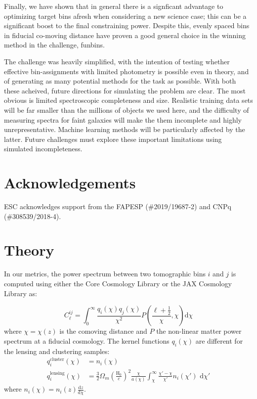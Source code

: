 \documentclass[twocolumn,twocolappendix]{aastex63}
\begin{document}
Finally, we have shown that in general there is a signficant advantage to optimizing
target bins afresh when considering a new science case; this can be a significant boost
to the final constraining power.
Despite this, evenly spaced bins in fiducial co-moving distance have proven
a good general choice in the winning method in the challenge, {\sc funbins}.

The challenge was heavily simplified, with the intention of testing whether
effective bin-assignments with limited photometry is possible even in theory,
and of generating as many potential methods for the task as possible.  With
both these acheived, future directions for simulating the problem are clear.
The most obvious is limited spectroscopic completeness and size.  Realistic
training data sets will be far smaller than the millions of objects we used here,
and the difficulty of measuring spectra for faint galaxies will make the them
incomplete and highly unrepresentative. Machine learning methods will be particularly
affected by the latter.  Future challenges must explore these important limitations
using simulated incompleteness.


\section{Acknowledgements}
ESC acknowledges support from the FAPESP (\#2019/19687-2) and CNPq  (\#308539/2018-4).




\appendix

\section{Theory}\label{app:theory}

In our metrics, the power spectrum between two tomographic bins $i$ and $j$ is
computed using either the Core Cosmology Library \citep{ccl} or the JAX
Cosmology Library \citep{jax-cosmo} as:

\begin{equation}
    C^{ij}_\ell = \int_0^{\infty} \frac{q_i(\chi) q_j(\chi)}{\chi^2} P\left(\frac{\ell +\frac{1}{2}}{\chi}, \chi \right) \mathrm{d}\chi
\end{equation}
where $\chi = \chi(z)$ is the comoving distance and $P$ the non-linear matter power spectrum at
a fiducial cosmology.  The kernel functions $q_i(\chi)$ are different for the lensing and clustering samples:
\begin{align}
    q^{\mathrm{cluster}}_i(\chi) &= n_i(\chi)\\
    q^{\mathrm{lensing}}_i(\chi) &= \frac{3}{2}\Omega_m \left(\frac{\mathrm{H}_0}{c}\right)^2 \frac{\chi}{a(\chi)} \int_\chi^{\infty} \frac{\chi' - \chi}{\chi'} n_i(\chi')\,\,\mathrm{d}\chi'
\end{align}
where $n_i(\chi) = n_i(z) \frac{\mathrm{d}z}{\mathrm{d}\chi}$.
\end{document}
